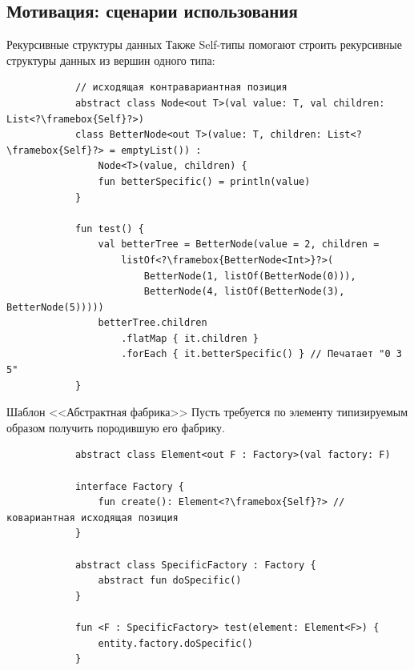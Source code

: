 \documentclass[handout,aspectratio=169,usenames,dvipsnames]{beamer}
\begin{document}
    \subsection{Мотивация: сценарии использования}

    \begin{frame}[fragile]{Рекурсивные структуры данных}
        Также Self-типы помогают строить рекурсивные структуры данных из вершин одного типа:
        \begin{verbatim}
            // исходящая контравариантная позиция
            abstract class Node<out T>(val value: T, val children: List<?\framebox{Self}?>)
            class BetterNode<out T>(value: T, children: List<?\framebox{Self}?> = emptyList()) :
                Node<T>(value, children) {
                fun betterSpecific() = println(value)
            }

            fun test() {
                val betterTree = BetterNode(value = 2, children =
                    listOf<?\framebox{BetterNode<Int>}?>(
                        BetterNode(1, listOf(BetterNode(0))),
                        BetterNode(4, listOf(BetterNode(3), BetterNode(5)))))
                betterTree.children
                    .flatMap { it.children }
                    .forEach { it.betterSpecific() } // Печатает "0 3 5"
            }
        \end{verbatim}
    \end{frame}

    \begin{frame}[fragile]{Шаблон <<Абстрактная фабрика>>}
        Пусть требуется по элементу типизируемым образом получить породившую его фабрику.

        \begin{verbatim}
            abstract class Element<out F : Factory>(val factory: F)

            interface Factory {
                fun create(): Element<?\framebox{Self}?> // ковариантная исходящая позиция
            }

            abstract class SpecificFactory : Factory {
                abstract fun doSpecific()
            }

            fun <F : SpecificFactory> test(element: Element<F>) {
                entity.factory.doSpecific()
            }
        \end{verbatim}
    \end{frame}
\end{document}
